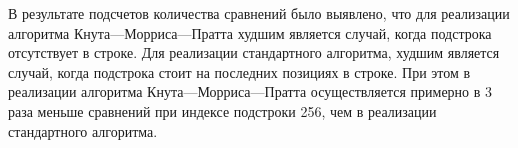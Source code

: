 В результате подсчетов количества сравнений было выявлено, что для реализации алгоритма Кнута---Морриса---Пратта худшим является случай, когда подстрока отсутствует в строке. 
Для реализации стандартного алгоритма, худшим является случай, когда подстрока стоит на последних позициях в строке. При этом в реализации алгоритма Кнута---Морриса---Пратта осуществляется примерно в 3 раза меньше сравнений при индексе подстроки 256, чем в реализации стандартного алгоритма.


